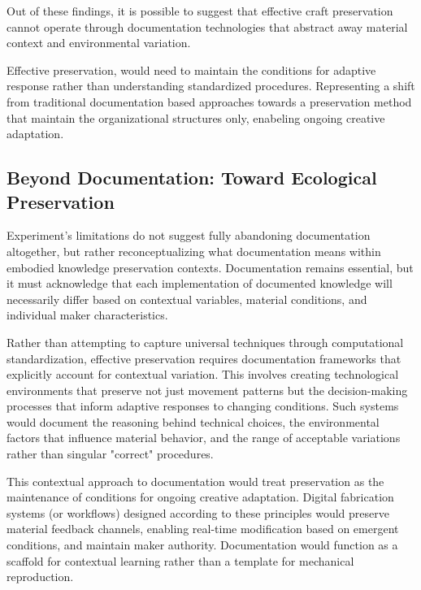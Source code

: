 \vspace{0.5cm}

Out of these findings, it is possible to suggest that effective craft preservation cannot operate through documentation technologies that abstract away material context and environmental variation.

Effective preservation, would need to maintain the conditions for adaptive response rather than understanding standardized procedures. Representing a shift from traditional documentation based approaches towards a preservation method that maintain the organizational structures only, enabeling ongoing creative adaptation.

\subsection{Beyond Documentation: Toward Ecological Preservation}

Experiment's limitations do not suggest fully abandoning documentation altogether, but rather reconceptualizing what documentation means within embodied knowledge preservation contexts. Documentation remains essential, but it must acknowledge that each implementation of documented knowledge will necessarily differ based on contextual variables, material conditions, and individual maker characteristics.

\vspace{0.5cm}

Rather than attempting to capture universal techniques through computational standardization, effective preservation requires documentation frameworks that explicitly account for contextual variation. This involves creating technological environments that preserve not just movement patterns but the decision-making processes that inform adaptive responses to changing conditions. Such systems would document the reasoning behind technical choices, the environmental factors that influence material behavior, and the range of acceptable variations rather than singular "correct" procedures.

\vspace{0.5cm}

This contextual approach to documentation would treat preservation as the maintenance of conditions for ongoing creative adaptation. Digital fabrication systems (or workflows) designed according to these principles would preserve material feedback channels, enabling real-time modification based on emergent conditions, and maintain maker authority. Documentation would function as a scaffold for contextual learning rather than a template for mechanical reproduction.

